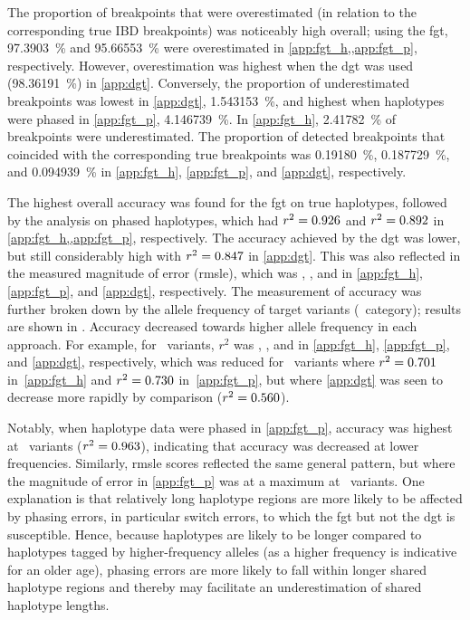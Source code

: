 The proportion of breakpoints that were overestimated (in relation to the corresponding true IBD breakpoints) was noticeably high overall; using the \gls{fgt}, \SI{97.3903}{\percent} and \SI{95.66553}{\percent} were overestimated in \cref{app:fgt_h,,app:fgt_p}, respectively.
However, overestimation was highest when the \gls{dgt} was used (\SI{98.36191}{\percent}) in \cref{app:dgt}.
Conversely, the proportion of underestimated breakpoints was lowest in \ref{app:dgt}, \SI{1.543153}{\percent}, and highest when haplotypes were phased in \ref{app:fgt_p}, \SI{4.146739}{\percent}.
In \ref{app:fgt_h}, \SI{2.41782}{\percent} of breakpoints were underestimated.
The proportion of detected breakpoints that coincided with the corresponding true breakpoints was \SI{0.19180}{\percent}, \SI{0.187729}{\percent}, and \SI{0.094939}{\percent} in \ref{app:fgt_h}, \ref{app:fgt_p}, and \ref{app:dgt}, respectively.

The highest overall accuracy was found for the \gls{fgt} on true haplotypes, followed by the analysis on phased haplotypes, which had ${r^2 = \dec{0.9262482}}$ and ${r^2 = \dec{0.8922048}}$ in \cref{app:fgt_h,,app:fgt_p}, respectively.
The accuracy achieved by the \gls{dgt} was lower, but still considerably high with ${r^2 = \dec{0.8474036}}$ in \cref{app:dgt}.
This was also reflected in the measured magnitude of error (\gls{rmsle}), which was , , and  in \ref{app:fgt_h}, \ref{app:fgt_p}, and \ref{app:dgt}, respectively.
The measurement of accuracy was further broken down by the allele frequency of target variants (\fk{}~category); results are shown in .
Accuracy decreased towards higher allele frequency in each approach.
For example, for ~variants, $r^2$ was , , and  in \ref{app:fgt_h}, \ref{app:fgt_p}, and \ref{app:dgt}, respectively,
which was reduced for ~variants where ${r^2 = \dec{0.701}}$ in~\ref{app:fgt_h} and ${r^2 = \dec{0.730}}$ in~\ref{app:fgt_p}, but where \ref{app:dgt} was seen to decrease more rapidly by comparison (${r^2 = \dec{0.560}}$).

Notably, when haplotype data were phased in \cref{app:fgt_p}, accuracy was highest at ~variants (${r^2 = \dec{0.963}}$), indicating that accuracy was decreased at lower frequencies.
Similarly, \gls{rmsle} scores reflected the same general pattern, but where the magnitude of error in \ref{app:fgt_p} was at a maximum at ~variants.
One explanation is that relatively long haplotype regions are more likely to be affected by phasing errors, in particular switch errors, to which the \gls{fgt} but not the \gls{dgt} is susceptible.
Hence, because  haplotypes are likely to be longer compared to haplotypes tagged by higher-frequency alleles (as a higher frequency is indicative for an older age), phasing errors are more likely to fall within longer shared haplotype regions and thereby may facilitate an underestimation of shared haplotype lengths.

